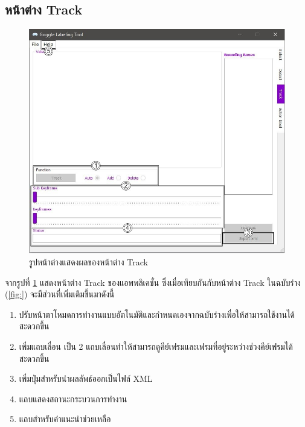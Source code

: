 \subsection*{หน้าต่าง Track}
\begin{figure}[!ht]
  \centering
    \includegraphics[scale=0.4]{chapter4/images/Final_ui/Track.jpg}
    \caption{รูปหน้าต่างแสดงผลของหน้าต่าง Track}
    \label{fig:final_track}
\end{figure}
จากรูปที่ \ref{fig:final_track} แสดงหน้าต่าง Track ของแอพพลิเคชั่น ซึ่งเมื่อเทียบกันกับหน้าต่าง Track ในฉบับร่าง (\ref{fig:}) จะมีส่วนที่เพิ่มเติมขึ้นมาดังนี้
\begin{enumerate}
	\item ปรับหน้าตาโหมดการทำงานแบบอัตโนมัติและกำหนดเองจากฉบับร่างเพื่อให้สามารถใช้งานได้สะดวกขึ้น
	\item เพิ่มแถบเลื่อน เป็น 2 แถบเลื่อนทำให้สามารถดูคีย์เฟรมและเฟรมที่อยู่ระหว่างช่วงคีย์เฟรมได้สะดวกขึ้น
	\item เพิ่มปุ่มสำหรับนำผลลัพธ์ออกเป็นไฟล์ XML 
	\item แถบแสดงสถานะกระบวนการทำงาน
	\item แถบสำหรับคำแนะนำช่วยเหลือ
\end{enumerate}		

\clearpage
